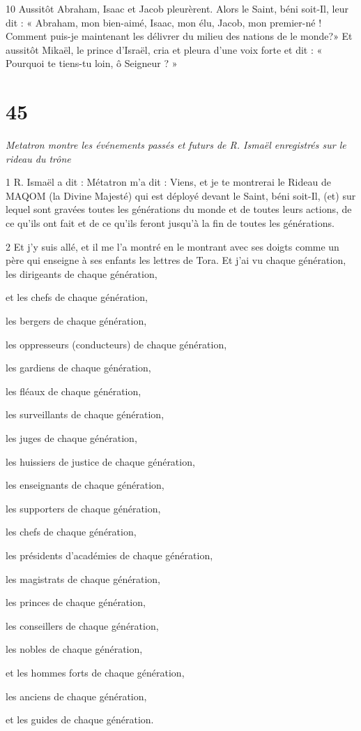 \par 10 Aussitôt Abraham, Isaac et Jacob pleurèrent. Alors le Saint, béni soit-Il, leur dit : « Abraham, mon bien-aimé, Isaac, mon élu, Jacob, mon premier-né ! Comment puis-je maintenant les délivrer du milieu des nations de le monde?» Et aussitôt Mikaël, le prince d'Israël, cria et pleura d'une voix forte et dit : « Pourquoi te tiens-tu loin, ô Seigneur ? »


\chapter{45}

\par \textit{Metatron montre les événements passés et futurs de R. Ismaël enregistrés sur le rideau du trône}

\par 1 R. Ismaël a dit : Métatron m'a dit : Viens, et je te montrerai le Rideau de MAQOM (la Divine Majesté) qui est déployé devant le Saint, béni soit-Il, (et) sur lequel sont gravées toutes les générations du monde et de toutes leurs actions, de ce qu'ils ont fait et de ce qu'ils feront jusqu'à la fin de toutes les générations.

\par 2 Et j'y suis allé, et il me l'a montré en le montrant avec ses doigts comme un père qui enseigne à ses enfants les lettres de Tora. Et j'ai vu chaque génération, les dirigeants de chaque génération,
\par et les chefs de chaque génération,
\par les bergers de chaque génération,
\par les oppresseurs (conducteurs) de chaque génération,
\par les gardiens de chaque génération,
\par les fléaux de chaque génération,
\par les surveillants de chaque génération,
\par les juges de chaque génération,
\par les huissiers de justice de chaque génération,
\par les enseignants de chaque génération,
\par les supporters de chaque génération,
\par les chefs de chaque génération,
\par les présidents d'académies de chaque génération,
\par les magistrats de chaque génération,
\par les princes de chaque génération,
\par les conseillers de chaque génération,
\par les nobles de chaque génération,
\par et les hommes forts de chaque génération,
\par les anciens de chaque génération,
\par et les guides de chaque génération.

